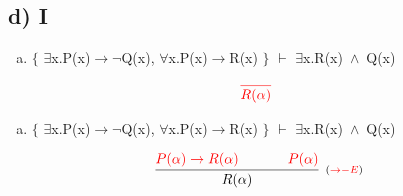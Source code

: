 \documentclass[aspectratio=43]{beamer}
\newcommand{\ria}{$\rightarrow$}
\newcommand{\fall}{$\forall$}
\newcommand{\ex}{$\exists$}
\newcommand{\nao}{$\neg$}
\newcommand{\andd}{$\wedge$}
\begin{document}
    \subsection{d) I}
    
    \begin{frame}[fragile]
    
    	\begin{enumerate}[d)]
			\item $\{$ \ex x.P(x)\ria \nao Q(x), \fall x.P(x)\ria R(x) $\}$ $\vdash$ \ex x.R(x)\ \andd\ Q(x) \\
		\end{enumerate}
        
        \vspace{80pt}
        
        \[
        \begin{array}{c}
		
        	\textcolor{red}{
            \infer[_{}]
            	{R(\alpha)}
            	{}
        	}
		\end{array}
        \]
        
	\end{frame}
    
    \begin{frame}[fragile]
    
    	\begin{enumerate}[d)]
			\item $\{$ \ex x.P(x)\ria \nao Q(x), \fall x.P(x)\ria R(x) $\}$ $\vdash$ \ex x.R(x)\ \andd\ Q(x) \\
		\end{enumerate}
        
        \vspace{75pt}
        
        \[
        \begin{array}{c}
		
        	\infer[_{(\textcolor{red}{\to -E})}]
            	{R(\alpha)}
            	{\textcolor{red}{P(\alpha) \rightarrow R(\alpha)} \hspace{35pt} \textcolor{red}{P(\alpha)}}
		\end{array}
        \]
        
	\end{frame}
    
    
    
\end{document}
